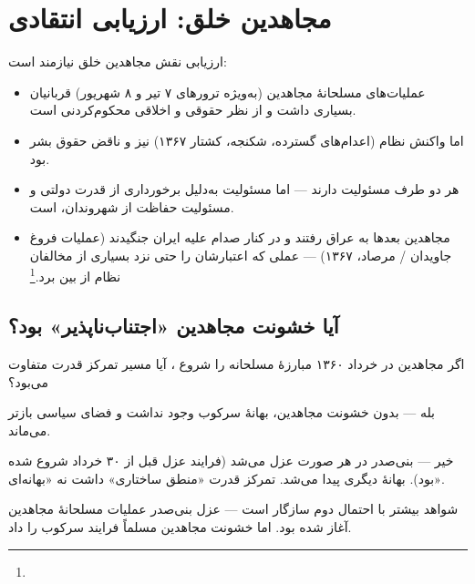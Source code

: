 \section{مجاهدین خلق: ارزیابی انتقادی}

\begin{noteBox}
ارزیابی نقش مجاهدین خلق نیازمند  است:
\begin{itemize}[label=\textcolor{cGold}{$\bullet$}, rightmargin=2em]
    \item عملیات‌های مسلحانهٔ مجاهدین (به‌ویژه ترورهای ۷ تیر و ۸ شهریور) قربانیان بسیاری داشت و از نظر حقوقی و اخلاقی محکوم‌کردنی است.
    \item اما واکنش نظام (اعدام‌های گسترده، شکنجه، کشتار ۱۳۶۷) نیز  و ناقض حقوق بشر بود.
    \item هر دو طرف مسئولیت دارند — اما مسئولیت  به‌دلیل برخورداری از قدرت دولتی و مسئولیت حفاظت از شهروندان،  است.
    \item مجاهدین بعدها به عراق رفتند و در کنار صدام علیه ایران جنگیدند (عملیات فروغ جاویدان / مرصاد، ۱۳۶۷) — عملی که اعتبارشان را حتی نزد بسیاری از مخالفان نظام از بین برد.\footnote{}
\end{itemize}
\end{noteBox}

\subsection{آیا خشونت مجاهدین «اجتناب‌ناپذیر» بود؟}

\begin{warningBox}
اگر مجاهدین در خرداد ۱۳۶۰ مبارزهٔ مسلحانه را شروع ، آیا مسیر تمرکز قدرت متفاوت می‌بود؟

\begin{description}[style=nextline, font=\bfseries\color{cPrimary}]
    \item[احتمال اول:] بله — بدون خشونت مجاهدین، بهانهٔ سرکوب وجود نداشت و فضای سیاسی بازتر می‌ماند.

    \item[احتمال دوم:] خیر — بنی‌صدر در هر صورت عزل می‌شد (فرایند عزل قبل از ۳۰ خرداد شروع شده بود). بهانهٔ دیگری پیدا می‌شد. تمرکز قدرت «منطق ساختاری» داشت نه «بهانه‌ای».

    \item[ارزیابی:] شواهد بیشتر با احتمال دوم سازگار است — عزل بنی‌صدر  عملیات مسلحانهٔ مجاهدین آغاز شده بود. اما خشونت مجاهدین مسلماً فرایند سرکوب را  داد.
\end{description}
\end{warningBox}

